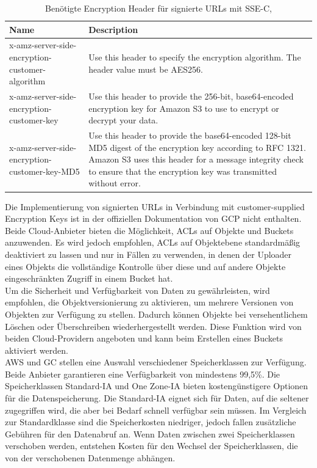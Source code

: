 \begin{table}[!h]
\centering
\begin{tabular}{ |p{5cm}|p{8cm}| }
\hline
Name & Description \\
\hline
\cline{1-2}
x-amz-server-side-encryption-customer-algorithm & Use this header to specify the encryption algorithm. The header value must be AES256.\\
\cline{1-2}
x-amz-server-side-encryption-customer-key & Use this header to provide the 256-bit, base64-encoded encryption key for Amazon S3 to use to encrypt or decrypt your data. \\
\cline{1-2}
x-amz-server-side-encryption-customer-key-MD5 & Use this header to provide the base64-encoded 128-bit MD5 digest of the encryption key according to RFC 1321. Amazon S3 uses this header for a message integrity check to ensure that the encryption key was transmitted without error.\\
\cline{1-2}
\end{tabular}
\caption{Benötigte Encryption Header für signierte URLs mit SSE-C, \cite{aws-sse-c} }
\end{table}

\newpage

Die Implementierung von signierten URLs in Verbindung mit customer-supplied Encryption Keys ist in der offiziellen Dokumentation von GCP nicht enthalten.\\

Beide Cloud-Anbieter bieten die Möglichkeit, ACLs auf Objekte und Buckets anzuwenden. Es wird jedoch empfohlen, ACLs auf Objektebene standardmäßig deaktiviert zu lassen und nur in Fällen zu verwenden, in denen der Uploader eines Objekts die vollständige Kontrolle über diese und auf andere Objekte eingeschränkten Zugriff in einem Bucket hat.\\

Um die Sicherheit und Verfügbarkeit von Daten zu gewährleisten, wird empfohlen, die Objektversionierung zu aktivieren, um mehrere Versionen von Objekten zur Verfügung zu stellen. Dadurch können Objekte bei versehentlichem Löschen oder Überschreiben wiederhergestellt werden. Diese Funktion wird von beiden Cloud-Providern angeboten und kann beim Erstellen eines Buckets aktiviert werden.\\

AWS und GC stellen eine Auswahl verschiedener Speicherklassen zur Verfügung. Beide Anbieter garantieren eine Verfügbarkeit von mindestens 99,5\%. Die Speicherklassen Standard-IA und One Zone-IA bieten kostengünstigere Optionen für die Datenspeicherung. Die Standard-IA eignet sich für Daten, auf die seltener zugegriffen wird, die aber bei Bedarf schnell verfügbar sein müssen. Im Vergleich zur Standardklasse sind die Speicherkosten niedriger, jedoch fallen zusätzliche Gebühren für den Datenabruf an. Wenn Daten zwischen zwei Speicherklassen verschoben werden, entstehen Kosten für den Wechsel der Speicherklassen, die von der verschobenen Datenmenge abhängen.\\


